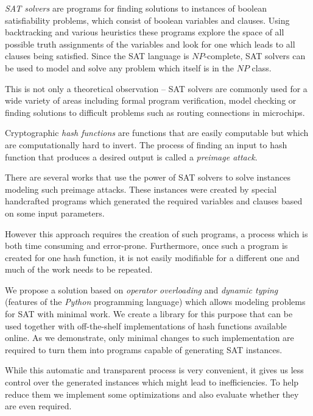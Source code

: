 
\emph{SAT solvers} are programs for finding solutions to instances of boolean satisfiability problems, which consist of boolean variables and clauses.
Using backtracking and various heuristics these programs explore the space of all possible truth assignments of the variables and look for one which leads to all clauses being satisfied.
Since the SAT language is $NP$-complete, SAT solvers can be used to model and solve any problem which itself is in the $NP$ class.

This is not only a theoretical observation -- SAT solvers are commonly used for a wide variety of areas including formal program verification, model checking or finding solutions to difficult problems such as routing connections in microchips.

Cryptographic \emph{hash functions} are functions that are easily computable but which are computationally hard to invert.
The process of finding an input to hash function that produces a desired output is called a \emph{preimage attack}.

There are several works that use the power of SAT solvers to solve instances modeling such preimage attacks.
These instances were created by special handcrafted programs which generated the required variables and clauses based on some input parameters.

However this approach requires the creation of such programs, a process which is both time consuming and error-prone.
Furthermore, once such a program is created for one hash function, it is not easily modifiable for a different one and much of the work needs to be repeated.

We propose a solution based on \emph{operator overloading} and \emph{dynamic typing} (features of the \emph{Python} programming language) which allows modeling problems for SAT with minimal work.
We create a library for this purpose that can be used together with off-the-shelf implementations of hash functions available online.
As we demonstrate, only minimal changes to such implementation are required to turn them into programs capable of generating SAT instances.

While this automatic and transparent process is very convenient, it gives us less control over the generated instances which might lead to inefficiencies.
To help reduce them we implement some optimizations and also evaluate whether they are even required.